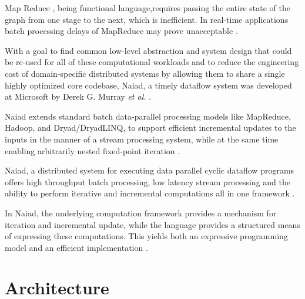 \documentclass[9pt,twocolumn,twoside]{../../styles/osajnl}
\begin{document}
Map Reduce \TE, being functional language,requires passing the entire
state of the graph from one stage to the next, which is
inefficient.  In real-time applications batch
processing delays of MapReduce may prove unacceptable
\cite{www-informationage-blog-wordpress-naiad}.

With a goal to find common low-level abstraction and system design
that could be re-used for all of these computational workloads and to
reduce the engineering cost of domain-specific distributed systems by
allowing them to share a single highly optimized core codebase, Naiad,
a timely dataflow system was developed at Microsoft by Derek G. Murray
\textit{et al.} \cite{paper3-Naiad}. 

Naiad extends standard batch data-parallel processing models like
MapReduce, Hadoop, and Dryad/DryadLINQ, to support efficient
incremental updates to the inputs in the manner of a stream processing
system, while at the same time enabling arbitrarily nested fixed-point
iteration \cite{paper1-Naiad}.

Naiad, a distributed system for executing data parallel cyclic
dataflow programs offers high throughput batch processing, low latency
stream processing and the ability to perform iterative and incremental
computations all in one framework \cite{www--blog-huula-review-naiad}.

In Naiad, the underlying computation framework provides a mechanism
for iteration and incremental update, while the language provides a
structured means of expressing these computations. This yields both an
expressive programming model and an efficient implementation
\cite{paper2-Naiad}.



\section{Architecture}
\end{document}
